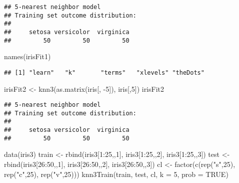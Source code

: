 \documentclass[
]{book}
\newenvironment{Shaded}{\begin{snugshade}}{\end{snugshade}}
\newcommand{\AttributeTok}[1]{\textcolor[rgb]{0.77,0.63,0.00}{#1}}
\newcommand{\ConstantTok}[1]{\textcolor[rgb]{0.00,0.00,0.00}{#1}}
\newcommand{\DecValTok}[1]{\textcolor[rgb]{0.00,0.00,0.81}{#1}}
\newcommand{\FunctionTok}[1]{\textcolor[rgb]{0.00,0.00,0.00}{#1}}
\newcommand{\NormalTok}[1]{#1}
\newcommand{\OtherTok}[1]{\textcolor[rgb]{0.56,0.35,0.01}{#1}}
\newcommand{\SpecialCharTok}[1]{\textcolor[rgb]{0.00,0.00,0.00}{#1}}
\newcommand{\StringTok}[1]{\textcolor[rgb]{0.31,0.60,0.02}{#1}}
\begin{document}
\begin{verbatim}
## 5-nearest neighbor model
## Training set outcome distribution:
## 
##     setosa versicolor  virginica 
##         50         50         50
\end{verbatim}

\begin{Shaded}
\begin{Highlighting}[]
\FunctionTok{names}\NormalTok{(irisFit1)}
\end{Highlighting}
\end{Shaded}

\begin{verbatim}
## [1] "learn"   "k"       "terms"   "xlevels" "theDots"
\end{verbatim}

\begin{Shaded}
\begin{Highlighting}[]
\NormalTok{irisFit2 }\OtherTok{\textless{}{-}} \FunctionTok{knn3}\NormalTok{(}\FunctionTok{as.matrix}\NormalTok{(iris[, }\SpecialCharTok{{-}}\DecValTok{5}\NormalTok{]), iris[,}\DecValTok{5}\NormalTok{])}
\NormalTok{irisFit2}
\end{Highlighting}
\end{Shaded}

\begin{verbatim}
## 5-nearest neighbor model
## Training set outcome distribution:
## 
##     setosa versicolor  virginica 
##         50         50         50
\end{verbatim}

\begin{Shaded}
\begin{Highlighting}[]
\FunctionTok{data}\NormalTok{(iris3)}
\NormalTok{train }\OtherTok{\textless{}{-}} \FunctionTok{rbind}\NormalTok{(iris3[}\DecValTok{1}\SpecialCharTok{:}\DecValTok{25}\NormalTok{,,}\DecValTok{1}\NormalTok{], iris3[}\DecValTok{1}\SpecialCharTok{:}\DecValTok{25}\NormalTok{,,}\DecValTok{2}\NormalTok{], iris3[}\DecValTok{1}\SpecialCharTok{:}\DecValTok{25}\NormalTok{,,}\DecValTok{3}\NormalTok{])}
\NormalTok{test }\OtherTok{\textless{}{-}} \FunctionTok{rbind}\NormalTok{(iris3[}\DecValTok{26}\SpecialCharTok{:}\DecValTok{50}\NormalTok{,,}\DecValTok{1}\NormalTok{], iris3[}\DecValTok{26}\SpecialCharTok{:}\DecValTok{50}\NormalTok{,,}\DecValTok{2}\NormalTok{], iris3[}\DecValTok{26}\SpecialCharTok{:}\DecValTok{50}\NormalTok{,,}\DecValTok{3}\NormalTok{])}
\NormalTok{cl }\OtherTok{\textless{}{-}} \FunctionTok{factor}\NormalTok{(}\FunctionTok{c}\NormalTok{(}\FunctionTok{rep}\NormalTok{(}\StringTok{"s"}\NormalTok{,}\DecValTok{25}\NormalTok{), }\FunctionTok{rep}\NormalTok{(}\StringTok{"c"}\NormalTok{,}\DecValTok{25}\NormalTok{), }\FunctionTok{rep}\NormalTok{(}\StringTok{"v"}\NormalTok{,}\DecValTok{25}\NormalTok{)))}
\FunctionTok{knn3Train}\NormalTok{(train, test, cl, }\AttributeTok{k =} \DecValTok{5}\NormalTok{, }\AttributeTok{prob =} \ConstantTok{TRUE}\NormalTok{)}
\end{Highlighting}
\end{Shaded}
\end{document}
